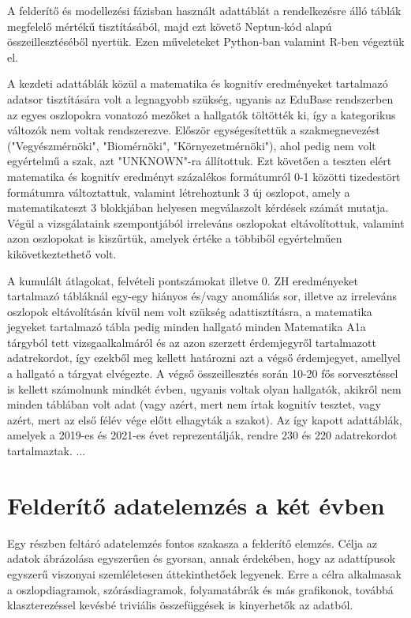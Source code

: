 \documentclass[12pt]{article}
\begin{document}
A felderítő és modellezési fázisban használt adattáblát a rendelkezésre álló táblák megfelelő mértékű tisztításából, majd ezt követő Neptun-kód alapú összeillesztéséből nyertük. Ezen műveleteket Python-ban valamint R-ben végeztük el.

A kezdeti adattáblák közül a matematika és kognitív eredményeket tartalmazó adatsor tisztítására volt a legnagyobb szükség, ugyanis az EduBase rendszerben az egyes oszlopokra vonatozó mezőket a hallgatók töltötték ki, így a kategorikus változók nem voltak rendszerezve. Először egységesítettük a szakmegnevezést ("Vegyészmérnöki", "Biomérnöki", "Környezetmérnöki"), ahol pedig nem volt egyértelmű a szak, azt "UNKNOWN"-ra állítottuk. Ezt követően a teszten elért matematika és kognitív eredményt százalékos formátumról 0-1 közötti tizedestört formátumra változtattuk, valamint létrehoztunk 3 új oszlopot, amely a matematikateszt 3 blokkjában helyesen megválaszolt kérdések számát mutatja. Végül a vizsgálataink szempontjából irreleváns oszlopokat eltávolítottuk, valamint azon oszlopokat is kiszűrtük, amelyek értéke a többiből egyértelműen kikövetkeztethető volt. 

A kumulált átlagokat, felvételi pontszámokat illetve 0. ZH eredményeket tartalmazó tábláknál egy-egy hiányos és/vagy anomáliás sor, illetve az irreleváns oszlopok eltávolításán kívül nem volt szükség adattisztításra, a matematika jegyeket tartalmazó tábla pedig minden hallgató minden Matematika A1a tárgyból tett vizsgaalkalmáról és az azon szerzett érdemjegyről tartalmazott adatrekordot, így ezekből meg kellett határozni azt a végső érdemjegyet, amellyel a hallgató a tárgyat elvégezte. A végső összeillesztés során 10-20 fős sorvesztéssel is kellett számolnunk mindkét évben, ugyanis voltak olyan hallgatók, akikről nem minden táblában volt adat (vagy azért, mert nem írtak kognitív tesztet, vagy azért, mert az első félév vége előtt elhagyták a szakot). Az így kapott adattáblák, amelyek a 2019-es és 2021-es évet reprezentálják, rendre 230 és 220 adatrekordot tartalmaztak. ...

\newpage

\section{Felderítő adatelemzés a két évben}

Egy részben feltáró adatelemzés fontos szakasza a felderítő elemzés. Célja az adatok ábrázolása egyszerűen és gyorsan, annak érdekében, hogy az adattípusok egyszerű viszonyai szemléletesen áttekinthetőek legyenek. Erre a célra alkalmasak a oszlopdiagramok, szórásdiagramok, folyamatábrák és más grafikonok, továbbá klaszterezéssel kevésbé triviális összefüggések is kinyerhetők az adatból.
\end{document}
